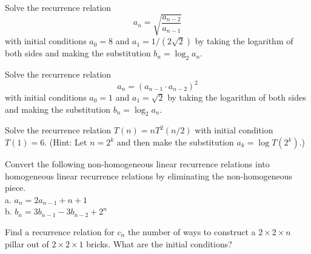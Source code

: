 
\begin{exercise}
Solve the recurrence relation
$$a_n=\sqrt{\frac{a_{n-2}}{a_{n-1}}}$$
with initial conditions $a_0=8$ and $a_1=1/(2\sqrt{2})$ by taking the logarithm of both sides and making the substitution $b_n=\log_2 a_n$.
\end{exercise}

\begin{exercise}
Solve the recurrence relation
$$a_n=(a_{n-1}\cdot a_{n-2})^2$$
with initial conditions $a_0=1$ and $a_1=\sqrt{2}$ by taking the logarithm of both sides and making the substitution $b_n=\log_2 a_n$.
\end{exercise}


\begin{exercise}
Solve the recurrence relation $T(n)=n T^2(n/2)$ with initial condition $T(1)=6$.  (Hint: Let $n=2^k$ and then make the substitution $a_k= \log T(2^k)$.)
\end{exercise}

\begin{exercise}
Convert the following non-homogeneous linear recurrence relations into homogeneous linear recurrence relations by eliminating the non-homogeneous piece.\\
a. $a_n=2a_{n-1}+n+1$\\
b. $b_n=3b_{n-1}-3b_{n-2}+2^n$
\end{exercise}

\begin{exercise} Find a recurrence relation for $c_n$ the number of ways to construct a $2 \times 2 \times n$ pillar out of $ 2 \times 2 \times 1$ bricks.  What are the initial conditions?
\end{exercise}

